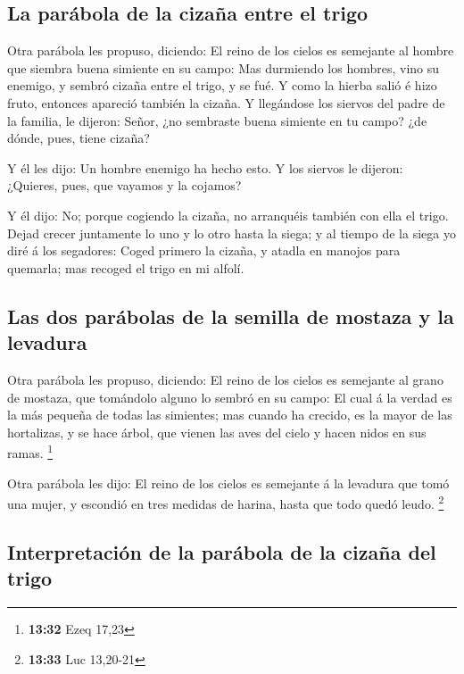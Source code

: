 \hypertarget{la-paruxe1bola-de-la-cizauxf1a-entre-el-trigo}{%
\subsection{La parábola de la cizaña entre el
trigo}\label{la-paruxe1bola-de-la-cizauxf1a-entre-el-trigo}}

 Otra parábola les propuso, diciendo: El reino de los
cielos es semejante al hombre que siembra buena simiente en su campo:
 Mas durmiendo los hombres, vino su enemigo, y sembró
cizaña entre el trigo, y se fué.  Y como la hierba salió é
hizo fruto, entonces apareció también la cizaña.  Y
llegándose los siervos del padre de la familia, le dijeron: Señor, ¿no
sembraste buena simiente en tu campo? ¿de dónde, pues, tiene cizaña?

 Y él les dijo: Un hombre enemigo ha hecho esto. Y los
siervos le dijeron: ¿Quieres, pues, que vayamos y la cojamos?

 Y él dijo: No; porque cogiendo la cizaña, no arranquéis
también con ella el trigo.  Dejad crecer juntamente lo uno
y lo otro hasta la siega; y al tiempo de la siega yo diré á los
segadores: Coged primero la cizaña, y atadla en manojos para quemarla;
mas recoged el trigo en mi alfolí.

\hypertarget{las-dos-paruxe1bolas-de-la-semilla-de-mostaza-y-la-levadura}{%
\subsection{Las dos parábolas de la semilla de mostaza y la
levadura}\label{las-dos-paruxe1bolas-de-la-semilla-de-mostaza-y-la-levadura}}

 Otra parábola les propuso, diciendo: El reino de los
cielos es semejante al grano de mostaza, que tomándolo alguno lo sembró
en su campo:  El cual á la verdad es la más pequeña de
todas las simientes; mas cuando ha crecido, es la mayor de las
hortalizas, y se hace árbol, que vienen las aves del cielo y hacen nidos
en sus ramas. \footnote{\textbf{13:32} Ezeq 17,23}

 Otra parábola les dijo: El reino de los cielos es
semejante á la levadura que tomó una mujer, y escondió en tres medidas
de harina, hasta que todo quedó leudo. \footnote{\textbf{13:33} Luc
  13,20-21}

\hypertarget{interpretaciuxf3n-de-la-paruxe1bola-de-la-cizauxf1a-del-trigo}{%
\subsection{Interpretación de la parábola de la cizaña del
trigo}\label{interpretaciuxf3n-de-la-paruxe1bola-de-la-cizauxf1a-del-trigo}}

